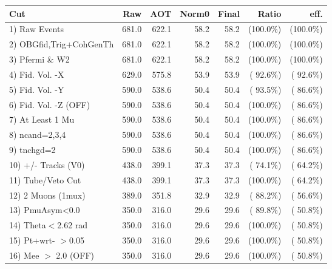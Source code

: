  \begin{table}[h!]\centering
 \begin{tabular}{||l||r|r|r|r|r|r||}
 \hline
 \hline
 Cut & Raw & AOT & Norm0 & Final & Ratio & eff.       \\
 \hline
  1) Raw Events           &        681.0 &        622.1 &         58.2 &         58.2 & (100.0\%) & (100.0\%) \\
  2) OBGfid,Trig+CohGenTh &        681.0 &        622.1 &         58.2 &         58.2 & (100.0\%) & (100.0\%) \\
  3) Pfermi \& W2         &        681.0 &        622.1 &         58.2 &         58.2 & (100.0\%) & (100.0\%) \\
  4) Fid. Vol. -X         &        629.0 &        575.8 &         53.9 &         53.9 & ( 92.6\%) & ( 92.6\%) \\
  5) Fid. Vol. -Y         &        590.0 &        538.6 &         50.4 &         50.4 & ( 93.5\%) & ( 86.6\%) \\
  6) Fid. Vol. -Z (OFF)   &        590.0 &        538.6 &         50.4 &         50.4 & (100.0\%) & ( 86.6\%) \\
  7) At Least 1 Mu        &        590.0 &        538.6 &         50.4 &         50.4 & (100.0\%) & ( 86.6\%) \\
  8) ncand=2,3,4          &        590.0 &        538.6 &         50.4 &         50.4 & (100.0\%) & ( 86.6\%) \\
  9) tnchgd=2             &        590.0 &        538.6 &         50.4 &         50.4 & (100.0\%) & ( 86.6\%) \\
 10) +/- Tracks (V0)      &        438.0 &        399.1 &         37.3 &         37.3 & ( 74.1\%) & ( 64.2\%) \\
 11) Tube/Veto Cut        &        438.0 &        399.1 &         37.3 &         37.3 & (100.0\%) & ( 64.2\%) \\
 12) 2 Muons (1mux)       &        389.0 &        351.8 &         32.9 &         32.9 & ( 88.2\%) & ( 56.6\%) \\
 13) PmuAsym<0.0          &        350.0 &        316.0 &         29.6 &         29.6 & ( 89.8\%) & ( 50.8\%) \\
 14) Theta$<$2.62 rad     &        350.0 &        316.0 &         29.6 &         29.6 & (100.0\%) & ( 50.8\%) \\
 15) Pt+wrt- $>$0.05      &        350.0 &        316.0 &         29.6 &         29.6 & (100.0\%) & ( 50.8\%) \\
 16) Mee $>$ 2.0  (OFF)   &        350.0 &        316.0 &         29.6 &         29.6 & (100.0\%) & ( 50.8\%) \\

\end{tabular}
\end{table}
